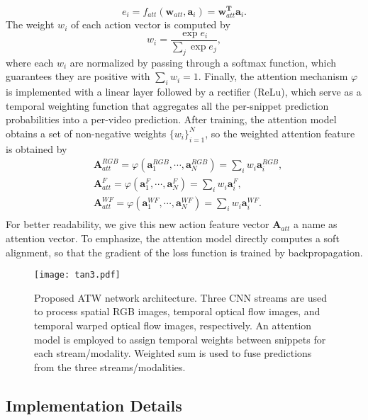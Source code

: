 \documentclass[runningheads,a4paper]{llncs}
\begin{document}
\begin{equation}
e_i = f_{att}(\mathbf{w}_{att},\mathbf{a}_i) = \mathbf{w}_{att}^\mathbf{T}\mathbf{a}_i.
\end{equation}
The weight $w_i$ of each action vector is computed by
\begin{equation}
w_i =  \frac{\exp{e_i}}{\sum_j\exp{e_j}},
\end{equation}
where each $w_i$ are normalized by passing through a softmax function, which guarantees
they are positive with $\sum_i{w_i}=1$.
Finally, the attention mechanism $\varphi$ is implemented with a linear layer followed by a rectifier (ReLu), which serve as a
temporal weighting function that aggregates all the per-snippet prediction probabilities into a per-video prediction.
After training, the attention model obtains a set of non-negative weights $\{w_i\}^N_{i=1}$, so the weighted attention
feature is obtained by
\begin{equation}
\begin{split}
&\mathbf{A}_{att}^{RGB} = \varphi(\mathbf{a}_1^{RGB}, \cdots, \mathbf{a}_N^{RGB}) =
\sum_{i} w_i{\mathbf{a}_i^{RGB}}, \\
&\mathbf{A}_{att}^{F} = \varphi(\mathbf{a}_1^{F}, \cdots, \mathbf{a}_N^{F}) =
\sum_{i} w_i{\mathbf{a}_i^{F}}, \\
&\mathbf{A}_{att}^{WF} = \varphi(\mathbf{a}_1^{WF}, \cdots, \mathbf{a}_N^{WF}) =
\sum_{i} w_i{\mathbf{a}_i^{WF}}. \\
\end{split}
\end{equation}
For better readability, we give this new action feature vector $\mathbf{A}_{att}$ a name as
attention vector. To emphasize, the attention model directly computes a soft alignment, so that the gradient
of the loss function is trained by backpropagation.

\begin{figure}[t]
\centering
\texttt{[image: tan3.pdf]}
\caption{Proposed ATW network architecture. Three CNN streams are used to process spatial RGB images,
temporal optical flow images, and temporal warped optical flow images, respectively. An attention model
is employed to assign temporal weights between snippets for each stream/modality. Weighted sum is used
to fuse predictions from the three streams/modalities.}
\label{fig:tan}
\end{figure}
\subsection{Implementation Details}
\end{document}
